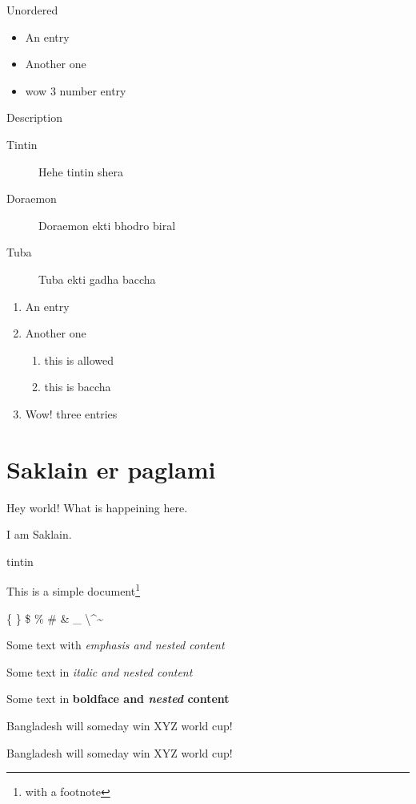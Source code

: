 \documentclass[10pt]{article} %
\begin{document}
Unordered
\begin{itemize}
    \item An entry
    \item Another one
    \item wow 3 number entry
\end{itemize}

Description
\begin{description}
    \item[Tintin] Hehe tintin shera
    \item[Doraemon] Doraemon ekti bhodro biral
    \item[Tuba] Tuba ekti gadha baccha   
\end{description}



\begin{enumerate}
    \item An entry
    \item Another one \begin{enumerate}
        \item this is allowed
        \item this is baccha
    \end{enumerate}
    \item Wow! three entries
\end{enumerate}





\section{Saklain er paglami}
Hey world! What is happeining here.

I am Saklain.

tintin


This is a simple document\footnote{with a footnote}

\{ \}        \$ \% \# \& \_  \textbackslash \textasciicircum \textasciitilde \textasciimacron 


Some text with \emph{emphasis and \emph{nested} content} %

Some text in \textit{italic and \textit{nested} content} %

Some text in \textbf{boldface and \textit{nested} content}

{\tiny Bangladesh will someday win XYZ world cup!}

{\small Bangladesh will someday win XYZ world cup!}
\end{document}
